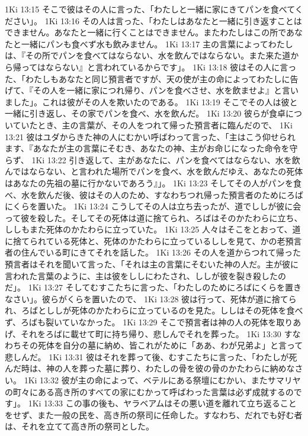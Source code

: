 1Ki 13:15  そこで彼はその人に言った、「わたしと一緒に家にきてパンを食べてください」。
1Ki 13:16  その人は言った、「わたしはあなたと一緒に引き返すことはできません。あなたと一緒に行くことはできません。またわたしはこの所であなたと一緒にパンも食べず水も飲みません。
1Ki 13:17  主の言葉によってわたしは、『その所でパンを食べてはならない、水を飲んではならない。また来た道から帰ってはならない』と言われているからです」。
1Ki 13:18  彼はその人に言った、「わたしもあなたと同じ預言者ですが、天の使が主の命によってわたしに告げて、『その人を一緒に家につれ帰り、パンを食べさせ、水を飲ませよ』と言いました」。これは彼がその人を欺いたのである。
1Ki 13:19  そこでその人は彼と一緒に引き返し、その家でパンを食べ、水を飲んだ。
1Ki 13:20  彼らが食卓についていたとき、主の言葉が、その人をつれて帰った預言者に臨んだので、
1Ki 13:21  彼はユダからきた神の人にむかい呼ばわって言った、「主はこう仰せられます、『あなたが主の言葉にそむき、あなたの神、主がお命じになった命令を守らず、
1Ki 13:22  引き返して、主があなたに、パンを食べてはならない、水を飲んではならない、と言われた場所でパンを食べ、水を飲んだゆえ、あなたの死体はあなたの先祖の墓に行かないであろう』」。
1Ki 13:23  そしてその人がパンを食べ、水を飲んだ後、彼はその人のため、すなわちつれ帰った預言者のためにろばにくらを置いた。
1Ki 13:24  こうしてその人は立ち去ったが、道でししが彼に会って彼を殺した。そしてその死体は道に捨てられ、ろばはそのかたわらに立ち、ししもまた死体のかたわらに立っていた。
1Ki 13:25  人々はそこをとおって、道に捨てられている死体と、死体のかたわらに立っているししを見て、かの老預言者の住んでいる町にきてそれを話した。
1Ki 13:26  その人を道からつれて帰った預言者はそれを聞いて言った、「それは主の言葉にそむいた神の人だ。主が彼に言われた言葉のように、主は彼をししにわたされ、ししが彼を裂き殺したのだ」。
1Ki 13:27  そしてむすこたちに言った、「わたしのためにろばにくらを置きなさい」。彼らがくらを置いたので、
1Ki 13:28  彼は行って、死体が道に捨てられ、ろばとししが死体のかたわらに立っているのを見た。ししはその死体を食べず、ろばも裂いていなかった。
1Ki 13:29  そこで預言者は神の人の死体を取りあげ、それをろばに載せて町に持ち帰り、悲しんでそれを葬った。
1Ki 13:30  すなわちその死体を自分の墓に納め、皆これがために「ああ、わが兄弟よ」と言って悲しんだ。
1Ki 13:31  彼はそれを葬って後、むすこたちに言った、「わたしが死んだ時は、神の人を葬った墓に葬り、わたしの骨を彼の骨のかたわらに納めなさい。
1Ki 13:32  彼が主の命によって、ベテルにある祭壇にむかい、またサマリヤの町々にある高き所のすべての家にむかって呼ばわった言葉は必ず成就するのです」。
1Ki 13:33  この事の後も、ヤラベアムはその悪い道を離れて立ち返ることをせず、また一般の民を、高き所の祭司に任命した。すなわち、だれでも好む者は、それを立てて高き所の祭司とした。

